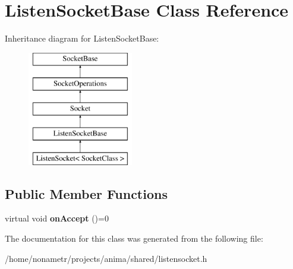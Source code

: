 \hypertarget{classListenSocketBase}{
\section{ListenSocketBase Class Reference}
\label{classListenSocketBase}
}
Inheritance diagram for ListenSocketBase:\begin{figure}[H]
\begin{center}
\leavevmode
\includegraphics[height=5.000000cm]{classListenSocketBase}
\end{center}
\end{figure}
\subsection*{Public Member Functions}
\begin{DoxyCompactItemize}
\item 
\hypertarget{classListenSocketBase_a18052506cf4593bfdbfc885a1b596814}{
virtual void {\bfseries onAccept} ()=0}
\label{classListenSocketBase_a18052506cf4593bfdbfc885a1b596814}

\end{DoxyCompactItemize}


The documentation for this class was generated from the following file:\begin{DoxyCompactItemize}
\item 
/home/nonametr/projects/anima/shared/listensocket.h\end{DoxyCompactItemize}
